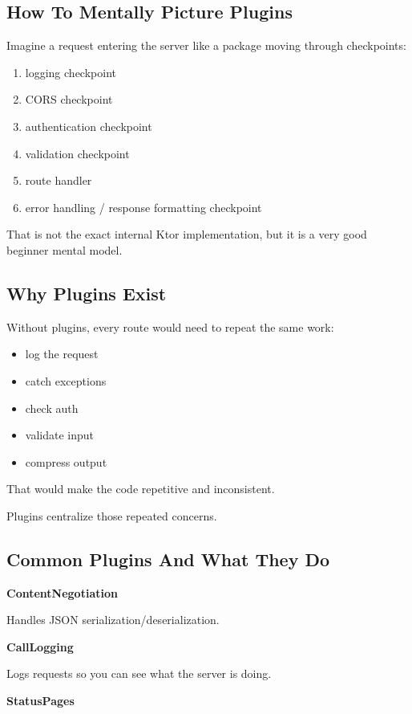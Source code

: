 \documentclass[11pt,a4paper]{article}
\begin{document}
\subsection{How To Mentally Picture Plugins}

Imagine a request entering the server like a package moving through checkpoints:
\begin{enumerate}
    \item logging checkpoint
    \item CORS checkpoint
    \item authentication checkpoint
    \item validation checkpoint
    \item route handler
    \item error handling / response formatting checkpoint
\end{enumerate}

That is not the exact internal Ktor implementation, but it is a very good beginner mental model.

\subsection{Why Plugins Exist}

Without plugins, every route would need to repeat the same work:
\begin{itemize}
    \item log the request
    \item catch exceptions
    \item check auth
    \item validate input
    \item compress output
\end{itemize}

That would make the code repetitive and inconsistent.

Plugins centralize those repeated concerns.

\subsection{Common Plugins And What They Do}

\textbf{ContentNegotiation}

Handles JSON serialization/deserialization.

\textbf{CallLogging}

Logs requests so you can see what the server is doing.

\textbf{StatusPages}
\end{document}
